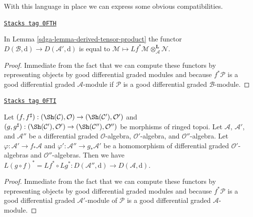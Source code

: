 With this language in place we can express some obvious compatibilities.

\begin{lemma}
\label{sdga-lemma-compose-pullback-tensor}
\href{https://stacks.math.columbia.edu/tag/0FTH}{\texttt{Stacks tag 0FTH}}

In Lemma \ref{sdga-lemma-derived-tensor-product} the functor
$D(\mathcal{B}, \text{d}) \to D(\mathcal{A}', \text{d})$ is equal to
$\mathcal{M} \mapsto
Lf^*\mathcal{M} \otimes_\mathcal{A}^\mathbf{L} \mathcal{N}$.
\end{lemma}

\begin{proof}
Immediate from the fact that we can compute these functors
by representing objects by good differential graded modules
and because $f^*\mathcal{P}$ is a good differential graded
$\mathcal{A}$-module if $\mathcal{P}$ is a good differential
graded $\mathcal{B}$-module.
\end{proof}

\begin{lemma}
\label{sdga-lemma-compose-pullback}
\href{https://stacks.math.columbia.edu/tag/0FTI}{\texttt{Stacks tag 0FTI}}

Let $(f, f^\sharp) : (\Sh(\mathcal{C}), \mathcal{O})
\to (\Sh(\mathcal{C}'), \mathcal{O}')$ and
$(g, g^\sharp) : (\Sh(\mathcal{C}'), \mathcal{O}')
\to (\Sh(\mathcal{C}''), \mathcal{O}'')$
be morphisms of ringed topoi. Let $\mathcal{A}$, $\mathcal{A}'$, and
$\mathcal{A}''$ be a differential graded $\mathcal{O}$-algebra,
$\mathcal{O}'$-algebra, and $\mathcal{O}''$-algebra. Let
$\varphi : \mathcal{A}' \to f_*\mathcal{A}$ and
$\varphi' : \mathcal{A}'' \to g_*\mathcal{A}'$
be a homomorphism of differential graded $\mathcal{O}'$-algebras
and $\mathcal{O}''$-algebras.
Then we have $L(g \circ f)^* = Lf^* \circ Lg^* :
D(\mathcal{A}'', \text{d}) \to D(\mathcal{A}, \text{d})$.
\end{lemma}

\begin{proof}
Immediate from the fact that we can compute these functors
by representing objects by good differential graded modules
and because $f^*\mathcal{P}$ is a good differential
graded $\mathcal{A}'$-module of $\mathcal{P}$ is a good
differential graded $\mathcal{A}$-module.
\end{proof}

